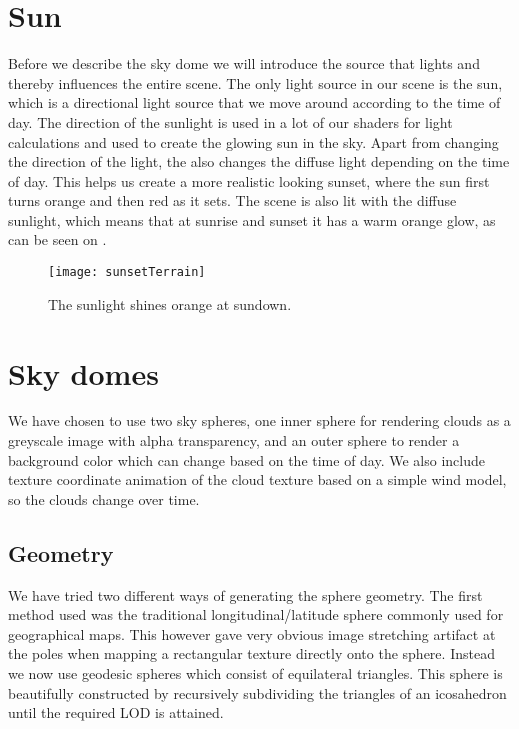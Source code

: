 \section{Sun}
Before we describe the sky dome we will introduce the source that
lights and thereby influences the entire scene. The only light source
in our scene is the sun, which is a directional light source that we
move around according to the time of day. The direction of the
sunlight is used in a lot of our shaders for light calculations and
used to create the glowing sun in the sky. Apart from changing the
direction of the light, the  also changes the diffuse
light depending on the time of day. This helps us create a more
realistic looking sunset, where the sun first turns orange and then
red as it sets. The scene is also lit with the diffuse sunlight, which
means that at sunrise and sunset it has a warm orange glow, as can be
seen on .

\begin{figure}
  \centering
  \texttt{[image: sunsetTerrain]}
  \caption{The sunlight shines orange at sundown.}
  \label{fig:sunsetTerrain}
\end{figure}



\section{Sky domes}
We have chosen to use two sky spheres, one inner sphere for rendering
clouds as a greyscale image with alpha transparency, and an outer
sphere to render a background color which can change based on the time
of day. We also include texture coordinate animation of the cloud
texture based on a simple wind model, so the clouds change over time.

\subsection{Geometry}
We have tried two different ways of generating the sphere
geometry. The first method used was the traditional
longitudinal/latitude sphere commonly used for geographical maps. This
however gave very obvious image stretching artifact at the poles when
mapping a rectangular texture directly onto the sphere. Instead we now
use geodesic spheres which consist of equilateral triangles. This
sphere is beautifully constructed by recursively subdividing the
triangles of an icosahedron until the required LOD is attained.

